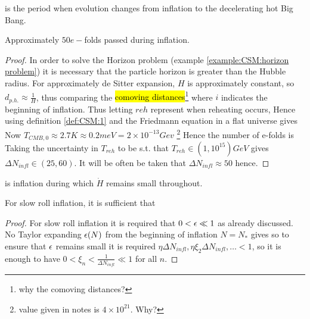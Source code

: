 \documentclass{article}
\begin{document}
\begin{definition}[Reheating]
 is the period when evolution changes from inflation to the decelerating hot Big Bang. 
\end{definition}

\begin{prop}
Approximately $50 e-$folds passed during inflation. 
\end{prop}
\begin{proof}
In order to solve the Horizon problem (example \ref{example:CSM:horizon problem}) it is necessary that the particle horizon is greater than the Hubble radius. For approximately de Sitter expansion, $H$ is approximately constant, so $d_{p.h.}\approx \frac{1}{H}$, thus comparing the \hl{comoving distances}\footnote{why the comoving distances?} 
where $i$ indicates the beginning of inflation. Thus letting $reh$ represent when reheating occurs, 
Hence using definition \ref{def:CSM:1} and the Friedmann equation in a flat universe 
gives 
Now $T_{CMB,0} \approx 2.7K \approx 0.2 meV = 2 \times 10^{-13} Gev $
\footnote{value given in notes is $4\times 10^{21}$. Why?}
Hence the number of e-folds is 
Taking the uncertainty in $T_{reh}$ to be s.t. that $T_{reh} \in (1,10^{15}) GeV$ gives $\Delta N_{infl} \in (25,60)$. It will be often be taken that $\Delta N_{infl} \approx 50$ hence. 
\end{proof}

\begin{definition}
 is inflation during which $\dot{H}$ remains small throughout.
\end{definition}

\begin{prop}
For slow roll inflation, it is sufficient that 
\end{prop}
\begin{proof}
For slow roll inflation it is required that $0 < \epsilon \ll 1$ as already discussed. No Taylor expanding $\epsilon(N)$ from the beginning of inflation $N=N_\ast$ gives 
so to ensure that $\epsilon$ remains small it is required $\eta \Delta N_{infl}, \eta \xi_2 \Delta N_{infl}, \dots < 1$, so it is enough to have $0<\xi_n < \frac{1}{\Delta N_{infl}} \ll 1$ for all $n$. 
\end{proof}
\end{document}
